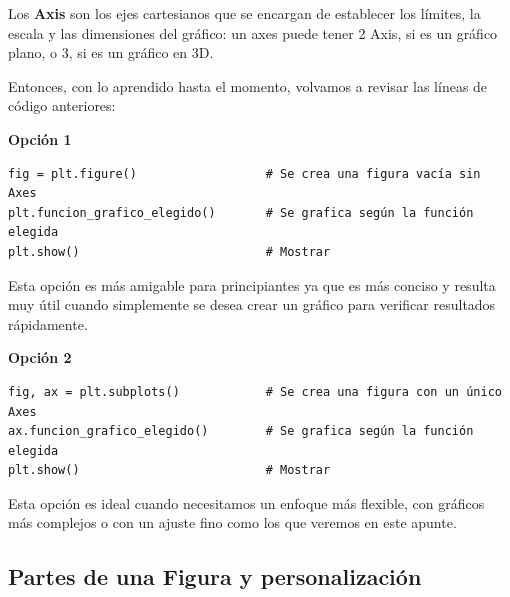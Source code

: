 \documentclass[
  letterpaper,
  DIV=11,
  numbers=noendperiod]{scrreprt}
\begin{document}
\begin{tcolorbox}[enhanced jigsaw, bottomrule=.15mm, leftrule=.75mm, opacityback=0, colback=white, toprule=.15mm, bottomtitle=1mm, opacitybacktitle=0.6, rightrule=.15mm, left=2mm, arc=.35mm, coltitle=black, title=\textcolor{quarto-callout-note-color}{\faInfo}\hspace{0.5em}{\textbf{¡Ojo! No confundir axes con axis}\\
}, breakable, toptitle=1mm, colframe=quarto-callout-note-color-frame, titlerule=0mm, colbacktitle=quarto-callout-note-color!10!white]

Los \textbf{Axis} son los ejes cartesianos que se encargan de establecer
los límites, la escala y las dimensiones del gráfico: un axes puede
tener 2 Axis, si es un gráfico plano, o 3, si es un gráfico en 3D.

\end{tcolorbox}

Entonces, con lo aprendido hasta el momento, volvamos a revisar las
líneas de código anteriores:

\textbf{Opción 1}

\begin{verbatim}
fig = plt.figure()                  # Se crea una figura vacía sin Axes
plt.funcion_grafico_elegido()       # Se grafica según la función elegida
plt.show()                          # Mostrar 
\end{verbatim}

Esta opción es más amigable para principiantes ya que es más conciso y
resulta muy útil cuando simplemente se desea crear un gráfico para
verificar resultados rápidamente.

\textbf{Opción 2}

\begin{verbatim}
fig, ax = plt.subplots()            # Se crea una figura con un único Axes
ax.funcion_grafico_elegido()        # Se grafica según la función elegida
plt.show()                          # Mostrar
\end{verbatim}

Esta opción es ideal cuando necesitamos un enfoque más flexible, con
gráficos más complejos o con un ajuste fino como los que veremos en este
apunte.

\subsection{Partes de una Figura y
personalización}\label{partes-de-una-figura-y-personalizaciuxf3n}
\end{document}
